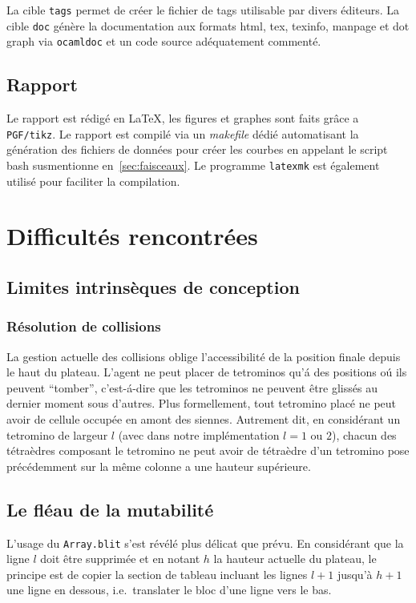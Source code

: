 \documentclass{report}
\begin{document}
La cible
\texttt{tags} permet de créer le fichier de tags utilisable par divers éditeurs.
La cible \texttt{doc} génère la documentation aux formats html, tex, texinfo,
manpage et dot graph via \texttt{ocamldoc} et un code source adéquatement
commenté.




\section{Rapport}
Le rapport est rédigé en \LaTeX{}, les figures et graphes sont faits grâce a
\texttt{PGF/tikz}. Le rapport est compilé via un \textit{makefile} dédié
automatisant la génération des fichiers de données pour créer les courbes en
appelant le script bash susmentionne en~\ref{sec:faisceaux}. Le
programme \texttt{latexmk} est également utilisé pour faciliter la compilation.




\chapter{Difficultés rencontrées}

\section{Limites intrinsèques de conception}
\subsection{Résolution de collisions}
La gestion actuelle des collisions oblige l'accessibilité de la position finale
depuis le haut du plateau. L'agent ne peut placer de tetrominos qu'\'a des
positions o\'u ils peuvent ``tomber'', c'est-\'a-dire que les tetrominos ne
peuvent être glissés au dernier moment sous d'autres. Plus formellement, tout
tetromino placé ne peut avoir de cellule occupée en amont des siennes. Autrement
dit, en considérant un tetromino de largeur \(l\) (avec dans notre
implémentation \(l = 1\) ou \(2\)), chacun des tétraèdres composant le tetromino
ne peut avoir de tétraèdre d'un tetromino pose précédemment sur la même colonne
a une hauteur supérieure.

\section{Le fléau de la mutabilité}
L'usage du \texttt{Array.blit} s'est révélé plus délicat que prévu. En
considérant que la ligne \(l\) doit être supprimée et en notant \(h\) la hauteur
actuelle du plateau, le principe est de copier la section de tableau incluant
les lignes \(l+1\) jusqu'à \(h+1\) une ligne en dessous, i.e.\ translater le
bloc d'une ligne vers le bas.
\end{document}
